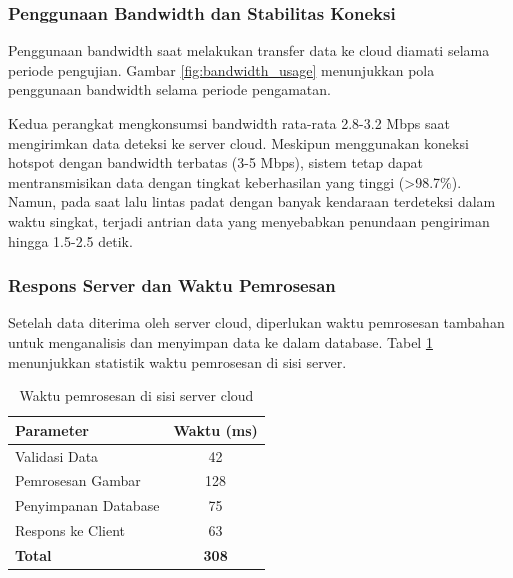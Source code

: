 \subsubsection{Penggunaan Bandwidth dan Stabilitas Koneksi}

Penggunaan bandwidth saat melakukan transfer data ke cloud diamati selama periode pengujian. Gambar \ref{fig:bandwidth_usage} menunjukkan pola penggunaan bandwidth selama periode pengamatan.


Kedua perangkat mengkonsumsi bandwidth rata-rata 2.8-3.2 Mbps saat mengirimkan data deteksi ke server cloud. Meskipun menggunakan koneksi hotspot dengan bandwidth terbatas (3-5 Mbps), sistem tetap dapat mentransmisikan data dengan tingkat keberhasilan yang tinggi (>98.7\%). Namun, pada saat lalu lintas padat dengan banyak kendaraan terdeteksi dalam waktu singkat, terjadi antrian data yang menyebabkan penundaan pengiriman hingga 1.5-2.5 detik.

\subsubsection{Respons Server dan Waktu Pemrosesan}

Setelah data diterima oleh server cloud, diperlukan waktu pemrosesan tambahan untuk menganalisis dan menyimpan data ke dalam database. Tabel \ref{tab:server_processing} menunjukkan statistik waktu pemrosesan di sisi server.

\begin{table}[htbp]
  \centering
  \begin{tabular}{|l|c|}
  \hline
  \rowcolor[HTML]{C0C0C0}
  \textbf{Parameter} & \textbf{Waktu (ms)} \\
  \hline
  Validasi Data & 42 \\
  \hline
  Pemrosesan Gambar & 128 \\
  \hline
  Penyimpanan Database & 75 \\
  \hline
  Respons ke Client & 63 \\
  \hline
  \textbf{Total} & \textbf{308} \\
  \hline
  \end{tabular}
  \caption{Waktu pemrosesan di sisi server cloud}
  \label{tab:server_processing}
\end{table}

